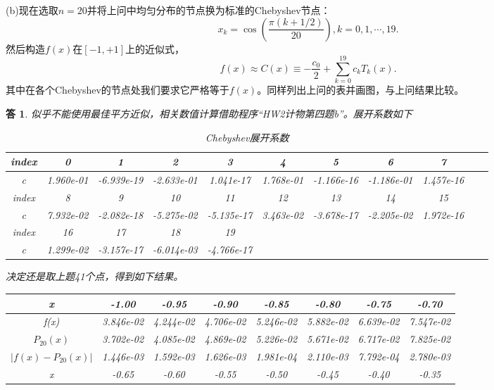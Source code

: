 \documentclass[10pt]{ctexart}
\newtheorem*{answer}{答}
\begin{document}
(b)现在选取$n=20$并将上问中均匀分布的节点换为标准的Chebyshev节点：
$$x_k=\cos{\left(\frac{\pi(k+1/2)}{20}\right)},k=0,1,\cdots,19.$$
然后构造$f(x)$在$[-1,+1]$上的近似式，
$$f(x)\approx C(x)\equiv-\frac{c_0}{2}+\sum\limits_{k=0}^{19}c_kT_k(x).$$
其中在各个Chebyshev的节点处我们要求它严格等于$f(x)$。同样列出上问的表并画图，与上问结果比较。
\begin{answer}
    似乎不能使用最佳平方近似，相关数值计算借助程序“HW2计物第四题b”。展开系数如下
    \begin{table}[H]
        \centering
        \begin{tabular}{ccccccccccc}
            \toprule
            index & 0 & 1 & 2 & 3 & 4 & 5 & 6 & 7\\
            \midrule
            c & 1.960e-01 & -6.939e-19 & -2.633e-01 & 1.041e-17 & 1.768e-01 & -1.166e-16 & -1.186e-01 & 1.457e-16\\
            \bottomrule
            \toprule
            index & 8 & 9 & 10 & 11 & 12 & 13 & 14 & 15\\
            \midrule
            c & 7.932e-02 & -2.082e-18 & -5.275e-02 & -5.135e-17 & 3.463e-02 & -3.678e-17 & -2.205e-02 & 1.972e-16\\
            \bottomrule
            \toprule
            index & 16 & 17 & 18 & 19 & & & &\\
            \midrule
            c & 1.299e-02 &-3.157e-17 &-6.014e-03 &-4.766e-17\\
            \bottomrule
        \end{tabular}
        \caption{Chebyshev展开系数}
    \end{table}
    决定还是取上题41个点，得到如下结果。
    \begin{table}[H]
        \centering
        \begin{tabular}{cccccccc}
            \toprule
            x & -1.00 & -0.95 & -0.90 & -0.85 & -0.80 & -0.75 & -0.70 \\
            \midrule
            f(x) & 3.846e-02 & 4.244e-02 & 4.706e-02 & 5.246e-02 & 5.882e-02 & 6.639e-02 & 7.547e-02\\
            $P_{20}(x)$ & 3.702e-02 &  4.085e-02 & 4.869e-02 & 5.226e-02 & 5.671e-02 & 6.717e-02 & 7.825e-02\\
            $\lvert f(x)-P_{20}(x)\rvert$ & 1.446e-03 & 1.592e-03 & 1.626e-03 &  1.981e-04 & 2.110e-03 &7.792e-04 & 2.780e-03\\
            \bottomrule
            \toprule
            x & -0.65 & -0.60 & -0.55 & -0.50 & -0.45 & -0.40 & -0.35 \\

\end{tabular}
\end{table}
\end{answer}
\end{document}
